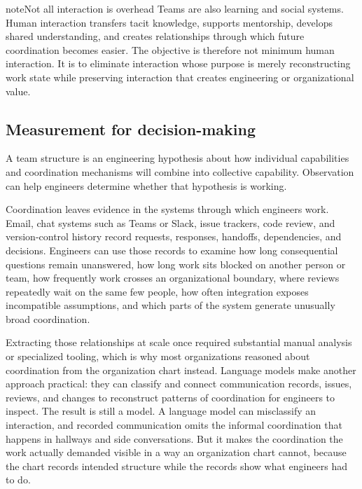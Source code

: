 \begin{bookbox}{note}{Not all interaction is overhead} %
Teams are also learning and social systems. Human interaction transfers tacit knowledge, supports
mentorship, develops shared understanding, and creates relationships through which future
coordination becomes easier. The objective is therefore not minimum human interaction. It is to
eliminate interaction whose purpose is merely reconstructing work state while preserving interaction
that creates engineering or organizational value.
\end{bookbox}

\subsection{Measurement for decision-making}\label{sec-measurement-teamwork}

A team structure is an engineering hypothesis about how individual capabilities and coordination
mechanisms will combine into collective capability. Observation can help engineers determine whether
that hypothesis is working.

Coordination leaves evidence in the systems through which engineers work. Email, chat systems such as
Teams or Slack, issue trackers, code review, and version-control history record requests, responses,
handoffs, dependencies, and decisions. Engineers can use those records to examine how long
consequential questions remain unanswered, how long work sits blocked on another person or team, how
frequently work crosses an organizational boundary, where reviews repeatedly wait on the same few
people, how often integration exposes incompatible assumptions, and which parts of the system
generate unusually broad coordination.

Extracting those relationships at scale once required substantial manual analysis or specialized
tooling, which is why most organizations reasoned about coordination from the organization chart
instead. Language models make another approach practical: they can classify and connect
communication records, issues, reviews, and changes to reconstruct patterns of coordination for
engineers to inspect. The result is still a model. A language model can misclassify an interaction,
and recorded communication omits the informal coordination that happens in hallways and side
conversations. But it makes the coordination the work actually demanded visible in a way an
organization chart cannot, because the chart records intended structure while the records show what
engineers had to do.

